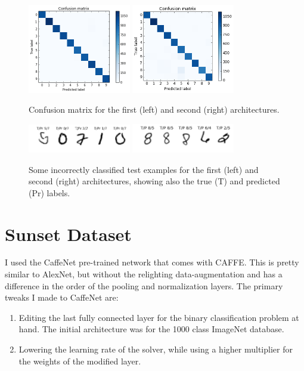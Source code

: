 \documentclass[5pt]{article}
\begin{document}
\begin{figure}[T]
  \centering{}
  \includegraphics[width=0.4\textwidth]{images/mnist_confusion1.png}
  \includegraphics[width=0.4\textwidth]{images/mnist_confusion2.png}
  \caption{Confusion matrix for the first (left) and second (right) 
  architectures.}
\label{fig:mnist_confusion}
\end{figure}

\begin{figure}[T]
  \centering{}
  \includegraphics[width=0.4\textwidth]{images/mnist_incorrect1.png}
  \includegraphics[width=0.4\textwidth]{images/mnist_incorrect2.png}
  \caption{Some incorrectly classified test examples for the first (left)
  and second (right) architectures, showing also the true (T) and predicted
  (Pr) labels.}
\label{fig:mnist_incorrect}
\end{figure}

\section{Sunset Dataset}
I used the CaffeNet pre-trained network that comes with CAFFE\@. This is pretty
similar to AlexNet, but without the relighting data-augmentation and has a
difference in the order of the pooling and normalization layers. The primary
tweaks I made to CaffeNet are:
\begin{enumerate}
  \item Editing the last fully connected layer for the binary classification
    problem at hand. The initial architecture was for the 1000 class ImageNet
    database.
  \item Lowering the learning rate of the solver, while using a higher
    multiplier for the weights of the modified layer.
\end{enumerate}
\end{document}
